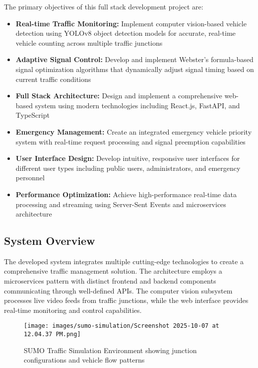 \documentclass[conference]{IEEEtran}
\begin{document}
The primary objectives of this full stack development project are:

\begin{itemize}
\item \textbf{Real-time Traffic Monitoring:} Implement computer vision-based vehicle detection using YOLOv8 object detection models for accurate, real-time vehicle counting across multiple traffic junctions
\item \textbf{Adaptive Signal Control:} Develop and implement Webster's formula-based signal optimization algorithms that dynamically adjust signal timing based on current traffic conditions
\item \textbf{Full Stack Architecture:} Design and implement a comprehensive web-based system using modern technologies including React.js, FastAPI, and TypeScript
\item \textbf{Emergency Management:} Create an integrated emergency vehicle priority system with real-time request processing and signal preemption capabilities
\item \textbf{User Interface Design:} Develop intuitive, responsive user interfaces for different user types including public users, administrators, and emergency personnel
\item \textbf{Performance Optimization:} Achieve high-performance real-time data processing and streaming using Server-Sent Events and microservices architecture
\end{itemize}

\subsection{System Overview}

The developed system integrates multiple cutting-edge technologies to create a comprehensive traffic management solution. The architecture employs a microservices pattern with distinct frontend and backend components communicating through well-defined APIs. The computer vision subsystem processes live video feeds from traffic junctions, while the web interface provides real-time monitoring and control capabilities.

\begin{figure}[H]
\centering
\texttt{[image: images/sumo-simulation/Screenshot 2025-10-07 at 12.04.37 PM.png]}
\caption{SUMO Traffic Simulation Environment showing junction configurations and vehicle flow patterns}
\label{fig:sumo_simulation}
\end{figure}
\end{document}
